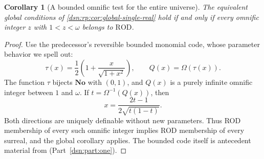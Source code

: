 \documentclass[11pt,a4paper]{article}
\numberwithin{equation}{section}
\newtheorem{corollary}[corollary]{Corollary}
\theoremstyle{definition}
\theoremstyle{remark}
\newcommand{\No}{\mathbf{No}}
\newcommand{\ROD}{\mathrm{ROD}}
\begin{document}
\begin{corollary}[A bounded omnific test for the entire universe]
The equivalent global conditions of
\cref{dsn:rp:cor:global-single-real} hold if and only if every omnific
integer $z$ with $1<z<\omega$ belongs to $\ROD$.
\end{corollary}
\begin{proof}
Use the predecessor's reversible bounded monomial code, whose
parameter behavior we spell out:
\[
 \tau(x)=\frac12\left(1+\frac{x}{\sqrt{1+x^2}}\right),
 \qquad Q(x)=\Omega(\tau(x)).
\]
The function $\tau$ bijects $\No$ with $(0,1)$, and $Q(x)$ is a
purely infinite omnific integer between $1$ and $\omega$. If
$t=\Omega^{-1}(Q(x))$, then
\[
 x=\frac{2t-1}{2\sqrt{t(1-t)}}.
\]
Both directions are uniquely definable without new parameters. Thus
ROD membership of every such omnific integer implies ROD membership
of every surreal, and the global corollary applies. The bounded code
itself is antecedent material from (Part~\ref{dsn:part:one}).
\end{proof}



\end{document}
